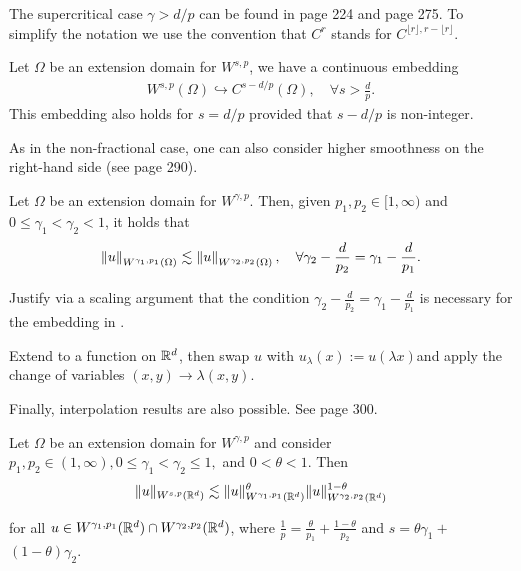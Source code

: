 \documentclass[
    a4paper,
    DIV=14,
    abstract=true,
    numbers=noenddot
]{scrartcl}
\begin{document}
The supercritical case $\gamma>d/p$ can be found in \cite{agranovich2015sobolev} page 224 and \cite{leoni2023first} page 275. To simplify the notation we use the convention that $C^r$ stands for $C^{\lfloor r \rfloor, r-\lfloor r \rfloor}$.
\begin{theorem}\label{morrey embedding}
    Let $\Omega $ be an extension domain for $W^{s,p}$,  we have a continuous embedding
    \begin{align*}
        W^{s,p}(\Omega) \hookrightarrow  C^{s-d/p}(\Omega), \quad\forall s> \frac{d}{p}.
    \end{align*}
    This embedding also holds for $s=d / p$ provided that $s-d/p $ is non-integer.
\end{theorem}
As in the non-fractional case, one can also consider higher smoothness on the right-hand side (see \cite{leoni2023first} page 290).
\begin{theorem}\label{higher smoothness embedding}
    Let $\Omega $ be an extension domain for $W^{\gamma,p}$. Then, given $p_1, p_2 \in [1,\infty)$ and $0\leq \gamma_1<\gamma_2< 1$, it holds that
    \begin{align*}
        \left\lVert u \right\rVert_{W^{\gamma_1,p_1}(\Omega )}\lesssim \left\lVert u \right\rVert_{W^{\gamma_2,p_2}(\Omega )}, \quad\forall \gamma_2 - \frac{d}{p_2} = \gamma_1 - \frac{d}{p_1}.
    \end{align*}
\end{theorem}
\begin{exercise}
    Justify via a scaling argument that the condition $\gamma_2 - \frac{d}{p_2} = \gamma_1 - \frac{d}{p_1}$ is necessary for the embedding in .
\end{exercise}
\begin{hint}
    Extend to a function on $\mathbb{R}^d$, then swap  $u$ with $u_\lambda (x):=u(\lambda x)$and apply the change of variables $(x,y)\to \lambda (x,y)$.
\end{hint}
Finally, interpolation results are also possible. See \cite{leoni2023first} page 300.
\begin{theorem}\label{interpolation embedding}
    Let $\Omega $ be an extension domain for $W^{\gamma,p}$ and consider $p_1,p_2 \in (1,\infty), 0 \leq \gamma_1<\gamma_2 \leq 1,$  and $0<\theta<1$. Then
    \begin{align*}
        \|u\|_{W^{s, p}(\mathbb{R}^d)} \lesssim\|u\|_{W^{\gamma_1, p_1}(\mathbb{R}^d)}^\theta\|u\|_{W^{\gamma_2, p_2}(\mathbb{R}^d)}^{1-\theta}
    \end{align*}

    for all $u \in W^{\gamma_1, p_1}(\mathbb{R}^d) \cap W^{\gamma_2, p_2}(\mathbb{R}^d)$, where $\frac{1}{p}=\frac{\theta}{p_1}+\frac{1-\theta}{p_2}$ and $s=\theta \gamma_1+$ $(1-\theta) \gamma_2.$
\end{theorem}
\end{document}
